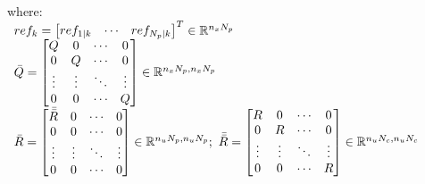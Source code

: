 \documentclass[12pt]{article}
\begin{document}
            where:  $ \begin{array}[t]{l}
                        ref_{k} =   \begin{bmatrix} ref_{1|k} & \cdots & ref_{N_p|k} \end{bmatrix}^T
                        \in \mathbb{R}^{n_x N_p}
                        \\
                        \bar{Q} =  \begin{bmatrix}  
                                        Q & 0 & \cdots & 0 \\ 
                                        0 & Q & \cdots & 0 \\ 
                                        \vdots & \vdots & \ddots & \vdots \\ 
                                        0 & 0 & \cdots & Q \\ 
                                    \end{bmatrix} 
                        \in \mathbb{R}^{n_x N_p,n_x N_p}
                        \\
                        \bar{R} =  \begin{bmatrix}  
                                        \bar{\bar{R}} & 0 & \cdots & 0 \\ 
                                        0 & 0 & \cdots & 0 \\ 
                                        \vdots & \vdots & \ddots & \vdots \\ 
                                        0 & 0 & \cdots & 0 \\ 
                                    \end{bmatrix}
                        \in \mathbb{R}^{n_u N_p,n_u N_p};\
                        
                        \bar{\bar{R}} = \begin{bmatrix}  
                                            R & 0 & \cdots & 0 \\ 
                                            0 & R & \cdots & 0 \\ 
                                            \vdots & \vdots & \ddots & \vdots \\ 
                                            0 & 0 & \cdots & R \\ 
                                        \end{bmatrix}
                        \in \mathbb{R}^{n_u N_c,n_u N_c} \\ 
                    \end{array} $
\end{document}
